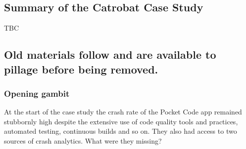 \subsection{Summary of the Catrobat Case Study}
TBC

\dotfill
\subsection{Old materials follow and are available to pillage before being removed.}

\subsubsection{Opening gambit}
At the start of the case study the crash rate of the Pocket Code app remained stubbornly high despite the extensive use of code quality tools and practices, automated testing, continuous builds and so on. They also had access to two sources of crash analytics. What were they missing?